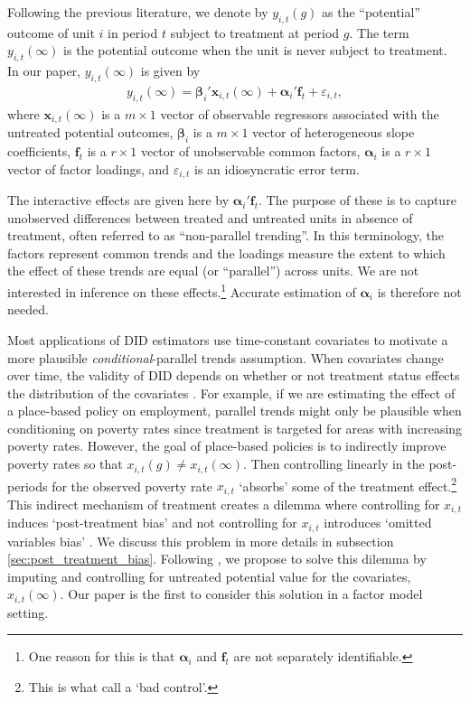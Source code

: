 \documentclass[12pt,fleqn]{article}
\def\*#1{\mathbf{#1}}
\def\+#1{\boldsymbol{#1}}
\begin{document}
Following the previous literature, we denote by $y_{i,t}(g)$ as the ``potential'' outcome of unit $i$ in period $t$ subject to treatment at period $g$. The term $y_{i,t}(\infty)$ is the potential outcome when the unit is never subject to treatment. In our paper, $y_{i,t}(\infty)$ is given by
\begin{align}
y_{i,t}(\infty) = \+\beta_i'\*x_{i,t}(\infty) +  \+\alpha_i'\*f_t + \varepsilon_{i,t},\label{y0}
\end{align}
where $\*x_{i,t}(\infty)$ is a $m\times 1$ vector of observable regressors associated with the untreated potential outcomes, $\+\beta_i$ is a $m\times 1$ vector of heterogeneous slope coefficients, $\*f_t$ is a $r \times 1$ vector of unobservable common factors, $\+\alpha_i$ is a $r\times 1$ vector of factor loadings, and $\varepsilon_{i,t}$ is an idiosyncratic error term.

The interactive effects are given here by $\+\alpha_i'\*f_t$. The purpose of these is to capture unobserved differences between treated and untreated units in absence of treatment, often referred to as ``non-parallel trending''. In this terminology, the factors represent common trends and the loadings measure the extent to which the effect of these trends are equal (or ``parallel'') across units. We are not interested in inference on these effects.\footnote{One reason for this is that $\+\alpha_i$ and $\*f_t$ are not separately identifiable.} Accurate estimation of $\+\alpha_i$ is therefore not needed.

Most applications of DID estimators use time-constant covariates to motivate a more plausible \emph{conditional}-parallel trends assumption. When covariates change over time, the validity of DID depends on whether or not treatment status effects the distribution of the covariates \citep{Caetano_Callaway_Payne_Rodrigues_2022}. For example, if we are estimating the effect of a place-based policy on employment, parallel trends might only be plausible when conditioning on poverty rates since treatment is targeted for areas with increasing poverty rates. However, the goal of place-based policies is to indirectly improve poverty rates so that $x_{i,t}(g) \neq x_{i,t}(\infty)$. Then controlling linearly in the post-periods for the observed poverty rate $x_{i,t}$ `absorbs' some of the treatment effect.\footnote{This is what \citet{angrist2009mostly} call a `bad control'.} This indirect mechanism of treatment creates a dilemma where controlling for $x_{i,t}$ induces `post-treatment bias' and not controlling for $x_{i,t}$ introduces `omitted variables bias' \citep{aklin2017can}. We discuss this problem in more details in subsection \ref{sec:post_treatment_bias}. Following \citet{Caetano_Callaway_Payne_Rodrigues_2022}, we propose to solve this dilemma by imputing and controlling for untreated potential value for the covariates, $x_{i,t}(\infty)$. Our paper is the first to consider this solution in a factor model setting. 
\end{document}
